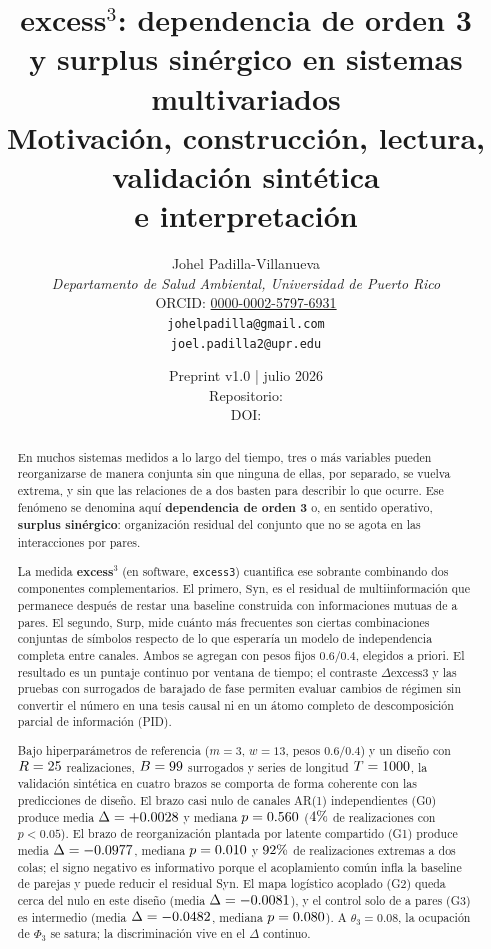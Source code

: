 \documentclass[11pt,a4paper]{article}
\title{\textbf{excess$^3$: dependencia de orden 3\\
y surplus sin\'ergico en sistemas multivariados}\\[0.45em]
\large Motivaci\'on, construcci\'on, lectura, validaci\'on sint\'etica\\
e interpretaci\'on}
\author{
Johel Padilla-Villanueva \\
\textit{Departamento de Salud Ambiental, Universidad de Puerto Rico} \\
ORCID: \href{https://orcid.org/0000-0002-5797-6931}{0000-0002-5797-6931} \\
\texttt{johelpadilla@gmail.com} \\
\texttt{joel.padilla2@upr.edu}
}
\date{Preprint v1.0 \quad | \quad julio 2026 \\[0.25em]\small Repositorio: \href{\ExcessThreeRepo}{\ExcessThreeRepoShort}\\[0.15em]\small DOI: \href{\ExcessThreeDOIURL}{\ExcessThreeDOI}}
\begin{document}
\maketitle

\begin{abstract}
\noindent
En muchos sistemas medidos a lo largo del tiempo, tres o m\'as variables
pueden reorganizarse de manera conjunta sin que ninguna de ellas, por
separado, se vuelva extrema, y sin que las relaciones de a dos basten para
describir lo que ocurre. Ese fen\'omeno se denomina aqu\'i
\textbf{dependencia de orden 3} o, en sentido operativo,
\textbf{surplus sin\'ergico}: organizaci\'on residual del conjunto que no se
agota en las interacciones por pares.

La medida \textbf{excess$^3$} (en software, \texttt{excess3}) cuantifica ese
sobrante combinando dos componentes complementarios. El primero,
$\mathrm{Syn}$, es el residual de multiinformaci\'on que permanece despu\'es
de restar una baseline construida con informaciones mutuas de a pares. El
segundo, $\mathrm{Surp}$, mide cu\'anto m\'as frecuentes son ciertas
combinaciones conjuntas de s\'imbolos respecto de lo que esperar\'ia un
modelo de independencia completa entre canales. Ambos se agregan con pesos
fijos $0.6/0.4$, elegidos a priori. El resultado es un puntaje continuo por
ventana de tiempo; el contraste $\Delta\mathrm{excess3}$ y las pruebas con
surrogados de barajado de fase permiten evaluar cambios de r\'egimen sin
convertir el n\'umero en una tesis causal ni en un \'atomo completo de
descomposici\'on parcial de informaci\'on (PID).

Bajo hiperpar\'ametros de referencia ($m=3$, $w=13$, pesos $0.6/0.4$) y un
dise\~no con $R=25$ realizaciones, $B=99$ surrogados y series de
longitud $T=1000$, la validaci\'on sint\'etica en cuatro brazos se comporta
de forma coherente con las predicciones de dise\~no. El brazo casi nulo de
canales AR(1) independientes (G0) produce media
$\Delta=+0.0028$ y mediana $p=0.560$ ($4\%$ de
realizaciones con $p<0.05$). El brazo de reorganizaci\'on plantada por
latente compartido (G1) produce media $\Delta=-0.0977$, mediana
$p=0.010$ y $92\%$ de realizaciones extremas a dos colas; el signo
negativo es informativo porque el acoplamiento com\'un infla la baseline de
parejas y puede reducir el residual Syn. El mapa log\'istico acoplado (G2)
queda cerca del nulo en este dise\~no (media $\Delta=-0.0081$), y el
control solo de a pares (G3) es intermedio (media $\Delta=-0.0482$,
mediana $p=0.080$). A $\theta_3=0.08$, la ocupaci\'on de $\Phi_3$ se
satura; la discriminaci\'on vive en el $\Delta$ continuo.


\end{abstract}
\end{document}
